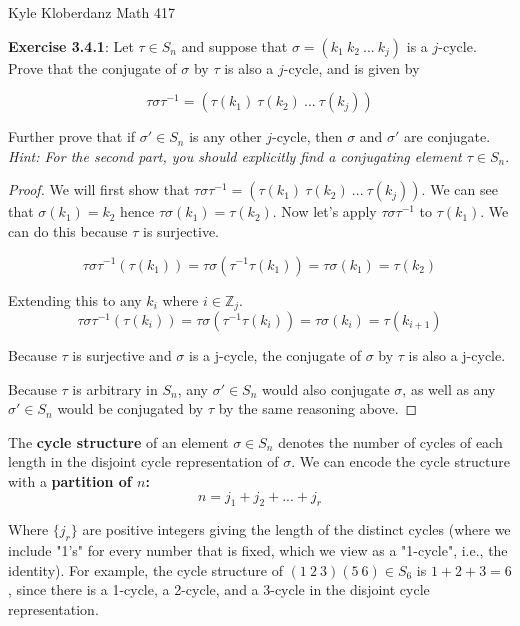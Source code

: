 \documentclass[a4paper]{article}
\begin{document}
\begin{myparindent}{0pt}

Kyle Kloberdanz \newline
Math 417 \newline

\textbf{Exercise 3.4.1}:
  Let $\tau \in S_n$ and suppose that $\sigma = (k_1 ~k_2 ~... ~k_j)$ is a
  $j$-cycle. Prove that the conjugate of $\sigma$ by $\tau$ is also a $j$-cycle,
  and is given by

  \[ \tau \sigma \tau^{-1} = (\tau(k_1) ~\tau(k_2) ~... ~\tau(k_j)) \]

  Further prove that if $\sigma' \in S_n$ is any other $j$-cycle, then $\sigma$
  and $\sigma'$ are conjugate. \textit{Hint: For the second part, you should
  explicitly find a conjugating element $\tau \in S_n$}.
\begin{proof}
  We will first show that $\tau \sigma \tau^{-1} = (\tau(k_1) ~\tau(k_2) ~... ~\tau(k_j))$.
  We can see that $\sigma(k_1) = k_2$
  hence $\tau \sigma(k_1) = \tau(k_2)$. Now let's apply $\tau \sigma \tau^{-1}$
  to $\tau(k_1)$. We can do this because $\tau$ is surjective.

  \[ \tau \sigma \tau^{-1}(\tau(k_1)) = \tau \sigma (\tau^{-1}\tau(k_1)) = \tau \sigma(k_1) = \tau(k_2) \]

  Extending this to any $k_i$ where $i \in \mathbb{Z}_j$.
  \[ \tau \sigma \tau^{-1}(\tau(k_{i})) = \tau \sigma (\tau^{-1}\tau(k_i)) = \tau \sigma(k_i) = \tau(k_{i + 1}) \]

  Because $\tau$ is surjective and $\sigma$ is a j-cycle, the conjugate of
  $\sigma$ by $\tau$ is also a j-cycle. \newline

  Because $\tau$ is arbitrary in $S_n$, any $\sigma' \in S_n$ would also
  conjugate $\sigma$, as well as any $\sigma' \in S_n$ would be conjugated by
  $\tau$ by the same reasoning above.
\end{proof}

The \textbf{cycle structure} of an element $\sigma \in S_n$ denotes the number
of cycles of each length in the disjoint cycle representation of $\sigma$.
We can encode the cycle structure with a \textbf{partition of $n$:}
\[ n = j_1 + j_2 + ... + j_r \]

Where $\{ j_r \}$ are positive integers giving the length of the distinct cycles
(where we include "1's" for every number that is fixed, which we view as a
"1-cycle", i.e., the identity). For example, the cycle structure of
$(1 ~2 ~3)(5 ~6) \in S_6$ is $1 + 2 + 3 = 6$, since there is a 1-cycle, a
2-cycle, and a 3-cycle in the disjoint cycle representation.
\newline


\end{myparindent}
\end{document}
